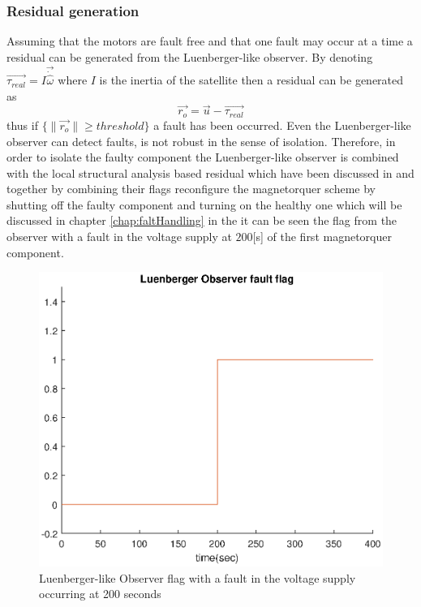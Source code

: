 \subsubsection{Residual generation}
 \label{sec:simpleObserveresidual}
 Assuming that the motors are fault free and that one fault may occur at a time a residual can be generated from the Luenberger-like observer. By denoting $\vec{\tau_{real}} =I\vec{\dot{{\hat \omega}}}$ where $I$ is the inertia of the satellite then a residual can be generated as
 \begin{equation}
 \vec{r_{o}} = \vec{u} - \vec{\tau_{real}}
 \label{eq:residualObs}
 \end{equation}
 thus if $\{\lVert \vec{r_{o}}\rVert \geq threshold \}$ a fault has been occurred. Even the Luenberger-like observer can detect faults, is not robust in the sense of isolation. Therefore, in order to isolate the faulty component the  Luenberger-like observer is combined with the local structural analysis based residual which have been discussed in  and together by combining their flags reconfigure the magnetorquer scheme by shutting off the faulty component and turning on the healthy one which will be discussed in chapter \ref{chap:faltHandling} in the  it can be seen the flag from the observer with a fault in the voltage supply at $200$[s] of the first magnetorquer component. 
 \begin{figure}[H]
 	\centering
 	\includegraphics[width=0.9\linewidth]{figures/Luenberger_Observerflag}
 	\caption{Luenberger-like Observer flag with a fault in the voltage supply occurring at 200 seconds   }
 	\label{fig:obsflag}
 \end{figure}